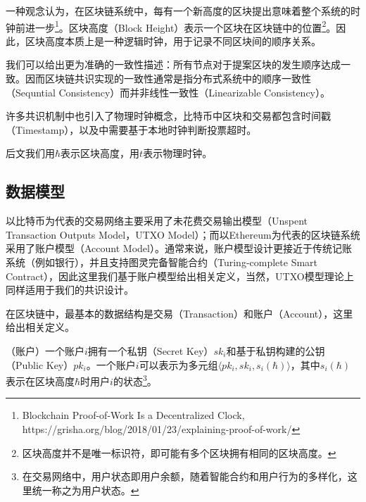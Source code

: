 一种观念认为，在区块链系统中，每有一个新高度的区块提出意味着整个系统的时钟前进一步\footnote{Blockchain Proof-of-Work Is a Decentralized Clock, https://grisha.org/blog/2018/01/23/explaining-proof-of-work/}。区块高度（Block Height）表示一个区块在区块链中的位置\footnote{区块高度并不是唯一标识符，即可能有多个区块拥有相同的区块高度。}。因此，区块高度本质上是一种逻辑时钟，用于记录不同区块间的顺序关系。


我们可以给出更为准确的一致性描述：所有节点对于提案区块的发生顺序达成一致。因而区块链共识实现的一致性通常是指分布式系统中的顺序一致性（Sequntial Consistency）而并非线性一致性（Linearizable Consistency）。%

许多共识机制中也引入了物理时钟概念，比特币中区块和交易都包含时间戳（Timestamp）\cite{nakamoto2008bitcoin}，以及\cite{gilad2017algorand}中需要基于本地时钟判断投票超时。


后文我们用$\hbar$表示区块高度，用$t$表示物理时钟。




\subsection{数据模型}
以比特币为代表的交易网络主要采用了未花费交易输出模型（Unspent Transaction Outputs Model，UTXO Model）；而以Ethereum为代表的区块链系统采用了账户模型（Account Model）。通常来说，账户模型设计更接近于传统记账系统（例如银行），并且支持图灵完备智能合约（Turing-complete Smart Contract），因此这里我们基于账户模型给出相关定义，当然，UTXO模型理论上同样适用于我们的共识设计。

在区块链中，最基本的数据结构是交易（Transaction）和账户（Account），这里给出相关定义。

\begin{definition}
（账户）一个账户$i$拥有一个私钥（Secret Key）$sk_i$和基于私钥构建的公钥（Public Key）$pk_i$。一个账户$i$可以表示为多元组$\langle pk_i,sk_i,s_i(\hbar)\rangle$，其中$s_i(\hbar)$表示在区块高度$\hbar$时用户$i$的状态\footnote{在交易网络中，用户状态即用户余额，随着智能合约和用户行为的多样化，这里统一称之为用户状态。}。
\end{definition}


